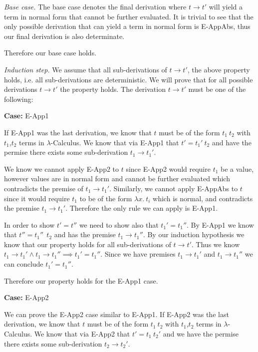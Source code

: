 \documentclass[12pt, fleqn]{article}
\begin{document}
\medskip
\emph{Base case.} The base case denotes the final derivation where $t \rightarrow t'$ will yield a
term in normal form that cannot be further evaluated. It is trivial to see that the only possible
derivation that can yield a term in normal form is E-AppAbs, thus our final derivation is also
determinate.

Therefore our base case holds.

\medskip
\emph{Induction step.} We assume that all sub-derivations of $t \rightarrow t'$, the above property
holds, i.e. all sub-derivations are deterministic. We will prove that for all possible derivations
$t \rightarrow t'$ the property holds. The derivation $t \rightarrow t'$ must be one of the following:

\medskip
\textbf{Case:} E-App1

If E-App1 was the last derivation, we know that $t$ must be of the form $t_1\:t_2$ with $t_1$,$t_2$
terms in $\lambda$-Calculus. We know that via E-App1 that $t' = t_1'\:t_2$ and have the permise there
exists some sub-derivation $t_1 \rightarrow t_1'$.

We know we cannot apply E-App2 to $t$ since E-App2 would require $t_1$ be a value, however values are
in normal form and cannot be further evaluated which contradicts the premise of $t_1 \rightarrow t_1'$.
Similarly, we cannot apply E-AppAbs to $t$ since it would require $t_1$ to be of the form $\lambda x.\:t_i$
which is normal, and contradicts the premise $t_1 \rightarrow t_1'$. Therefore the only rule we can apply is E-App1.

In order to show $t' = t''$ we need to show also that $t_1' = t_1''$. By E-App1 we know that $t'' = t_1''\:\:t_2$ and
has the premise $t_1 \rightarrow t_1''$. By our induction hypothesis we know that our property holds
for all sub-derivations of $t \rightarrow t'$. Thus we know $t_1 \rightarrow t_1' \land t_1 \rightarrow t_1'' \implies t_1' = t_1''$.
Since we have premises $t_1 \rightarrow t_1'$ and $t_1 \rightarrow t_1''$ we can conclude $t_1' = t_1''$.

Therefore our property holds for the E-App1 case.

\medskip
\textbf{Case:} E-App2

We can prove the E-App2 case similar to E-App1. If E-App2 was the last derivation, we know that $t$
must be of the form $t_1\:t_2$ with $t_1$,$t_2$ terms in $\lambda$-Calculus. We know that via E-App2 
that $t' = t_1\:t_2'$ and we have the permise there exists some sub-derivation $t_2 \rightarrow t_2'$.
\end{document}
